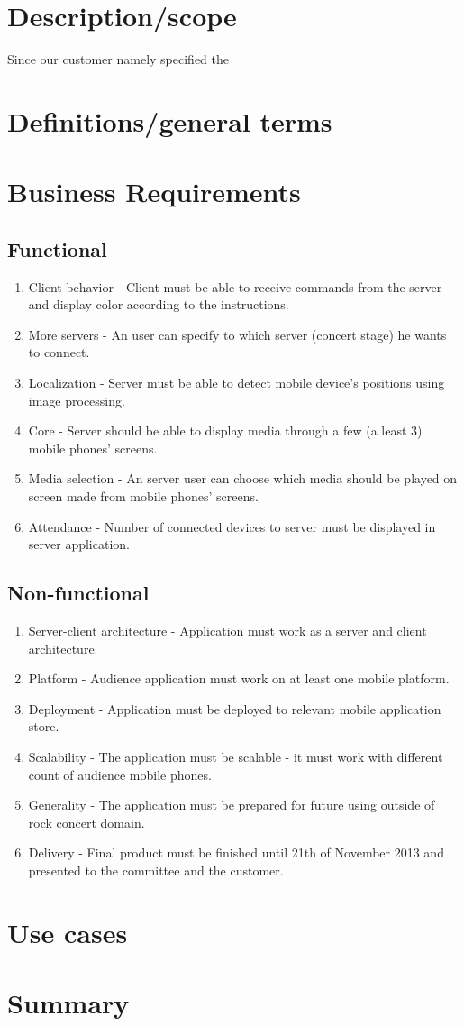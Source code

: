 \section{Description/scope}


Since our customer namely specified the 
\section{Definitions/general terms}
\section{Business Requirements}
\subsection{Functional}

    \begin{enumerate}
        \item Client behavior - Client must be able to receive commands from the server and display color according to the instructions.
        \item More servers - An user can specify to which server (concert stage) he wants to connect.
        \item Localization - Server must be able to detect mobile device's positions using image processing.
        \item Core - Server should be able to display media through a few (a least 3) mobile phones' screens.
        \item Media selection - An server user can choose which media should be played on screen made from mobile phones' screens.
        \item Attendance - Number of connected devices to server must be displayed in server application.
    \end{enumerate}

\subsection{Non-functional}

    \begin{enumerate}
        \item Server-client architecture - Application must work as a server and client architecture.
        \item Platform - Audience application must work on at least one mobile platform.
        \item Deployment - Application must be deployed to relevant mobile application store.
        \item Scalability - The application must be scalable - it must work with different count of audience mobile phones.
        \item Generality - The application must be prepared for future using outside of rock concert domain.
        \item Delivery - Final product must be finished until 21th of November 2013 and presented to the committee and the customer.
    \end{enumerate}
\section{Use cases}
\section{Summary}
